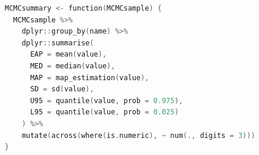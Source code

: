 \begin{lstlisting}[language=C++,label={code:PRE_07summary},caption={MCMCの要約を報告するコード}]
MCMCsummary <- function(MCMCsample) {
  MCMCsample %>%
    dplyr::group_by(name) %>%
    dplyr::summarise(
      EAP = mean(value),
      MED = median(value),
      MAP = map_estimation(value),
      SD = sd(value),
      U95 = quantile(value, prob = 0.975),
      L95 = quantile(value, prob = 0.025)
    ) %>%
    mutate(across(where(is.numeric), ~ num(., digits = 3)))
}
\end{lstlisting}
